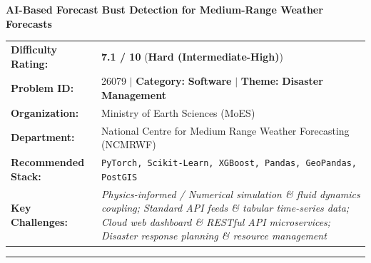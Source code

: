 \documentclass[10pt,a4paper]{article}
\begin{document}
\vspace{0.4cm}
{}

\begin{tcolorbox}[pscard, title={"\textbf{SIH26079} \quad $\vert$ \quad AI-Based Forecast Bust Detection for Medium-Range Weather Forecasts}]
\textbf{\large AI-Based Forecast Bust Detection for Medium-Range Weather Forecasts}\\[0.25cm]

\begin{tabular}{@{}lp{12.5cm}@{}}
\textbf{Difficulty Rating:} & \textcolor{diffhard}{\textbf{\Large 7.1 / 10}} \quad (\textbf{Hard (Intermediate-High)}) \\
\textbf{Problem ID:} & 26079 \quad $\vert$ \quad \textbf{Category:} \textbf{Software} \quad $\vert$ \quad \textbf{Theme:} \textbf{Disaster Management} \\
\textbf{Organization:} & Ministry of Earth Sciences (MoES) \\
\textbf{Department:} & National Centre for Medium Range Weather Forecasting (NCMRWF) \\
\textbf{Recommended Stack:} & \texttt{PyTorch, Scikit-Learn, XGBoost, Pandas, GeoPandas, PostGIS} \\
\textbf{Key Challenges:} & \textit{\small Physics-informed / Numerical simulation \& fluid dynamics coupling; Standard API feeds \& tabular time-series data; Cloud web dashboard \& RESTful API microservices; Disaster response planning \& resource management} \\
\end{tabular}

\vspace{0.2cm}
\hrule
\vspace{0.2cm}


\end{tcolorbox}
\end{document}
